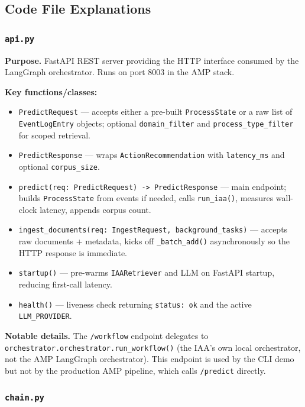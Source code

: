 \documentclass[12pt,a4paper]{article}
\begin{document}
\subsection{Code File Explanations}

\subsubsection{\texttt{api.py}}

\textbf{Purpose.} FastAPI REST server providing the HTTP interface consumed by the
LangGraph orchestrator. Runs on port 8003 in the AMP stack.

\textbf{Key functions/classes:}
\begin{itemize}[nosep]
  \item \texttt{PredictRequest} --- accepts either a pre-built \texttt{ProcessState}
    or a raw list of \texttt{EventLogEntry} objects; optional \texttt{domain\_filter}
    and \texttt{process\_type\_filter} for scoped retrieval.
  \item \texttt{PredictResponse} --- wraps \texttt{ActionRecommendation} with
    \texttt{latency\_ms} and optional \texttt{corpus\_size}.
  \item \texttt{predict(req: PredictRequest) -> PredictResponse} --- main endpoint;
    builds \texttt{ProcessState} from events if needed, calls \texttt{run\_iaa()},
    measures wall-clock latency, appends corpus count.
  \item \texttt{ingest\_documents(req: IngestRequest, background\_tasks)} --- accepts
    raw documents + metadata, kicks off \texttt{\_batch\_add()} asynchronously so
    the HTTP response is immediate.
  \item \texttt{startup()} --- pre-warms \texttt{IAARetriever} and LLM on FastAPI
    startup, reducing first-call latency.
  \item \texttt{health()} --- liveness check returning \texttt{status: ok} and
    the active \texttt{LLM\_PROVIDER}.
\end{itemize}

\textbf{Notable details.} The \texttt{/workflow} endpoint delegates to
\texttt{orchestrator.orchestrator.run\_workflow()} (the IAA's own local orchestrator,
not the AMP LangGraph orchestrator). This endpoint is used by the CLI demo but not
by the production AMP pipeline, which calls \texttt{/predict} directly.

\subsubsection{\texttt{chain.py}}
\end{document}
